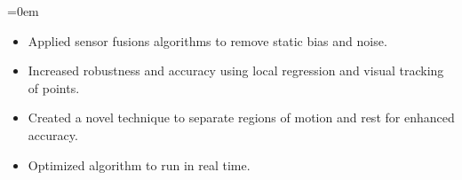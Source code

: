 \documentclass{article}
\newenvironment{longversion}{}{} %
\begin{document}
\begin{list} {}{\leftmargin=0em}
\begin{itemize}
      \item Applied sensor fusions algorithms to remove static bias and noise.
      \item Increased robustness and accuracy using local regression and visual tracking of points.
      \item Created a novel technique to separate regions of motion and rest for enhanced accuracy.
      \item Optimized algorithm to run in real time.
    \end{itemize}


\end{list}




\begin{longversion}
\end{longversion}
\end{document}
